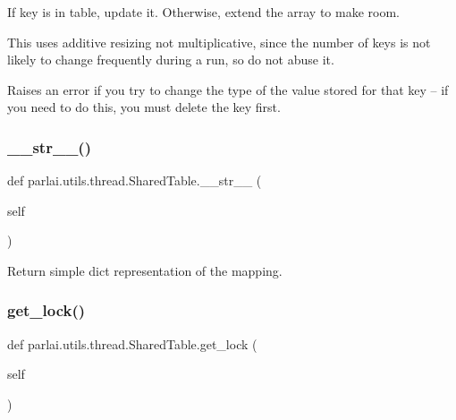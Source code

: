 \begin{DoxyVerb}If key is in table, update it. Otherwise, extend the array to make room.

This uses additive resizing not multiplicative, since the number
of keys is not likely to change frequently during a run, so do not
abuse it.

Raises an error if you try to change the type of the value stored for
that key -- if you need to do this, you must delete the key first.
\end{DoxyVerb}
 \mbox{\label{classparlai_1_1utils_1_1thread_1_1SharedTable_aa18f723bbdfce0ab50d9c36b20cec2c7}} 
\subsubsection{\texorpdfstring{\+\_\+\+\_\+str\+\_\+\+\_\+()}{\_\_str\_\_()}}
{\footnotesize\ttfamily def parlai.\+utils.\+thread.\+Shared\+Table.\+\_\+\+\_\+str\+\_\+\+\_\+ (\begin{DoxyParamCaption}\item[{}]{self }\end{DoxyParamCaption})}

\begin{DoxyVerb}Return simple dict representation of the mapping.
\end{DoxyVerb}
 \mbox{\label{classparlai_1_1utils_1_1thread_1_1SharedTable_ab9acef58b28d0c992c841a4cc11a5df2}} 
\subsubsection{\texorpdfstring{get\+\_\+lock()}{get\_lock()}}
{\footnotesize\ttfamily def parlai.\+utils.\+thread.\+Shared\+Table.\+get\+\_\+lock (\begin{DoxyParamCaption}\item[{}]{self }\end{DoxyParamCaption})}

